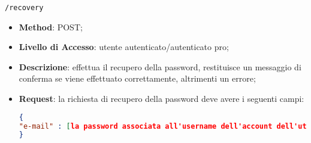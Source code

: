 	\item \texttt{/recovery}
		\begin{itemize}
			\item \textbf{Method}: POST;
			\item \textbf{Livello di Accesso}: utente autenticato/autenticato pro;
			\item \textbf{Descrizione}: effettua il recupero della password, restituisce un messaggio di conferma se viene effettuato correttamente, altrimenti un errore;
			\item \textbf{Request}: la richiesta di recupero della password deve avere i seguenti campi:
\begin{lstlisting}[language=json,firstnumber=1]
{
"e-mail" : [la password associata all'username dell'account dell'utente]
}
\end{lstlisting}
		\end{itemize}